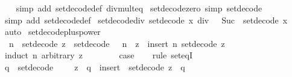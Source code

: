 \begin{isabellebody}
%
\isadelimproof
\ \ %
\endisadelimproof
%
\isatagproof
{}\isamarkupfalse%
\ {\isacharparenleft}simp\ add{\isacharcolon}\ set{\isacharunderscore}decode{\isacharunderscore}def\ div{\isacharunderscore}mult{}{\isacharunderscore}eq{\isacharparenright}%
\endisatagproof
{\isafoldproof}%
%
\isadelimproof
\isanewline
%
\endisadelimproof
\isanewline
{}\isamarkupfalse%
\ set{\isacharunderscore}decode{\isacharunderscore}zero\ {\isacharbrackleft}simp{\isacharbrackright}{\isacharcolon}\ {\isachardoublequoteopen}set{\isacharunderscore}decode\ {}\ {\isacharequal}\ {\isacharbraceleft}{\isacharbraceright}{\isachardoublequoteclose}\isanewline
%
\isadelimproof
\ \ %
\endisadelimproof
%
\isatagproof
{}\isamarkupfalse%
\ {\isacharparenleft}simp\ add{\isacharcolon}\ set{\isacharunderscore}decode{\isacharunderscore}def{\isacharparenright}%
\endisatagproof
{\isafoldproof}%
%
\isadelimproof
\isanewline
%
\endisadelimproof
\isanewline
{}\isamarkupfalse%
\ set{\isacharunderscore}decode{\isacharunderscore}div{\isacharunderscore}{}{\isacharcolon}\ {\isachardoublequoteopen}set{\isacharunderscore}decode\ {\isacharparenleft}x\ div\ {}{\isacharparenright}\ {\isacharequal}\ Suc\ {\isacharminus}{\isacharbackquote}\ set{\isacharunderscore}decode\ x{\isachardoublequoteclose}\isanewline
%
\isadelimproof
\ \ %
\endisadelimproof
%
\isatagproof
{}\isamarkupfalse%
\ auto%
\endisatagproof
{\isafoldproof}%
%
\isadelimproof
\isanewline
%
\endisadelimproof
\isanewline
{}\isamarkupfalse%
\ set{\isacharunderscore}decode{\isacharunderscore}plus{\isacharunderscore}power{\isacharunderscore}{}{\isacharcolon}\isanewline
\ \ {\isachardoublequoteopen}n\ {\isasymnotin}\ set{\isacharunderscore}decode\ z\ {\isasymLongrightarrow}\ set{\isacharunderscore}decode\ {\isacharparenleft}{}\ {\isacharcircum}\ n\ {\isacharplus}\ z{\isacharparenright}\ {\isacharequal}\ insert\ n\ {\isacharparenleft}set{\isacharunderscore}decode\ z{\isacharparenright}{\isachardoublequoteclose}\isanewline
%
\isadelimproof
%
\endisadelimproof
%
\isatagproof
{}\isamarkupfalse%
\ {\isacharparenleft}induct\ n\ arbitrary{\isacharcolon}\ z{\isacharparenright}\isanewline
\ \ \isamarkupfalse%
\ {}\isanewline
\ \ \isamarkupfalse%
\ {\isacharquery}case\isanewline
\ \ \isamarkupfalse%
\ {\isacharparenleft}rule\ set{\isacharunderscore}eqI{\isacharparenright}\isanewline
\ \ \ \ \isamarkupfalse%
\ {\isachardoublequoteopen}q\ {\isasymin}\ set{\isacharunderscore}decode\ {\isacharparenleft}{}\ {\isacharcircum}\ {}\ {\isacharplus}\ z{\isacharparenright}\ {\isasymlongleftrightarrow}\ q\ {\isasymin}\ insert\ {}\ {\isacharparenleft}set{\isacharunderscore}decode\ z{\isacharparenright}{\isachardoublequoteclose}\ \ q\isanewline

\end{isabellebody}
